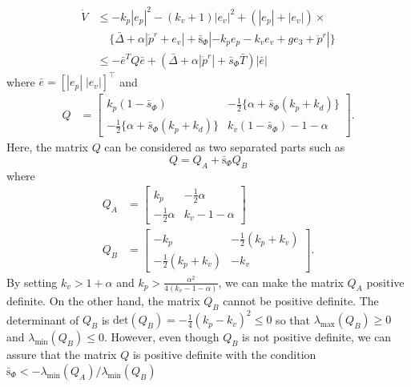 \documentclass[letterpaper, 10 pt, conference]{ieeeconf}  %
\begin{document}
\begin{align}
\dot{V} &\leq -k_p|e_p|^2 -(k_v+1)|e_v|^2 +(|e_p| + |e_v|) \times \nonumber \\
&\;\;\;\;\{\bar{\Delta} + \alpha|\dot{p}^r+e_v|+\bar{\text{s}}_\Phi|-k_pe_p-k_ve_v+ge_3+\ddot{p}^r|\} \nonumber \\
&\leq -\bar{e}^TQ\bar{e} + (\bar{\Delta}+\alpha|\dot{p}^r|+\bar{s}_\Phi\bar{T})|\bar{e}| \label{eq:dotV}
\end{align} 
where $\bar{e} = [|e_p|\;|e_v|]^\top$ and
\begin{align}
Q &= \left[
\begin{array}{rr}
k_p(1-\bar{s}_\Phi) & -\frac{1}{2}\{\alpha+\bar{s}_\Phi(k_p+k_d)\} \\
-\frac{1}{2}\{\alpha+\bar{s}_\Phi(k_p+k_d)\} & k_v(1-\bar{s}_\Phi)-1-\alpha 
\end{array}
\right].\nonumber 
\end{align}
Here, the matrix $Q$ can be considered as two separated parts such as
\begin{equation}
Q = Q_A + \bar{\text{s}}_\Phi Q_B \nonumber
\end{equation}
where
\begin{align}
Q_A &= \left[
\begin{array}{rr}
k_p & -\frac{1}{2}\alpha \\ -\frac{1}{2}\alpha & k_v-1-\alpha
\end{array}
\right] \nonumber \\
Q_B &= \left[
\begin{array}{rr}
-k_p & -\frac{1}{2}(k_p+k_v) \\ -\frac{1}{2}(k_p+k_v) & -k_v
\end{array}
\right].
\end{align}
By setting $k_v > 1+\alpha$ and $k_p > \frac{\alpha^2}{4(k_v-1-\alpha)}$, we can make the matrix $Q_A$ positive definite. 
On the other hand, the matrix $Q_B$ cannot be positive definite. The determinant of $Q_B$ is $\text{det}(Q_B) = -\frac{1}{4}(k_p-k_v)^2 \leq 0$ so that $\lambda_{\max}(Q_B)\geq0$ and $\lambda_{\min}(Q_B)\leq 0$.
However, even though $Q_B$ is not positive definite, we can assure that the matrix $Q$ is positive definite with the condition $\bar{\text{s}}_\Phi < -\lambda_{\min}(Q_A)/\lambda_{\min}(Q_B)$
\end{document}
